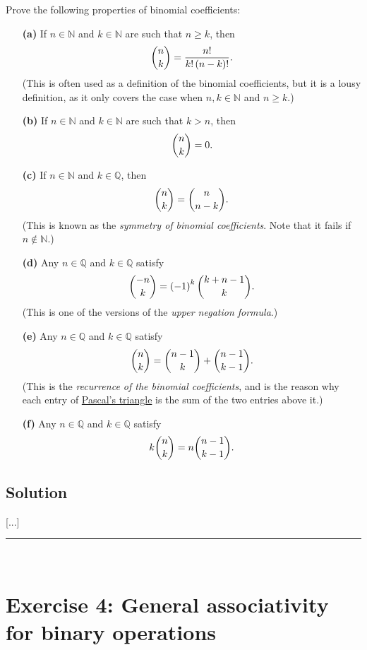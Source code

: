 \documentclass[paper=a4, fontsize=12pt]{scrartcl} %
\newcommand{\QQ}{\mathbb{Q}} %
\newcommand{\NN}{\mathbb{N}} %
\newcommand{\tup}[1]{\left( #1 \right)}
\newcommand{\horrule}[1]{\rule{\linewidth}{#1}} %
\theoremstyle{plainsl}
\theoremstyle{definition}
\theoremstyle{remark}
\begin{document}
Prove the following properties of binomial coefficients:

\begin{enumerate}

\item[\textbf{(a)}]
If $n \in \NN$ and $k \in \NN$ are such that $n \geq k$,
then
\[
\dbinom{n}{k}
= \dfrac{n!}{k! \tup{n-k}!} .
\]
(This is often used as a definition of the binomial coefficients,
but it is a lousy definition, as it
only covers the case when $n, k \in \NN$ and $n \geq k$.)

\item[\textbf{(b)}]
If $n \in \NN$ and $k \in \NN$ are such that $k > n$, then
\[
\dbinom{n}{k} = 0.
\]

\item[\textbf{(c)}]
If $n \in \NN$ and $k \in \QQ$, then
\[
\dbinom{n}{k} = \dbinom{n}{n-k} .
\]
(This is known as the \textit{symmetry of binomial coefficients}.
Note that it fails if $n \notin \NN$.)

\item[\textbf{(d)}]
Any $n \in \QQ$ and $k \in \QQ$ satisfy
\[
\dbinom{-n}{k} = \tup{-1}^k \dbinom{k + n - 1}{k} .
\]
(This is one of the versions of the \textit{upper negation formula}.)

\item[\textbf{(e)}]
Any $n \in \QQ$ and $k \in \QQ$ satisfy
\[
\dbinom{n}{k} = \dbinom{n-1}{k} + \dbinom{n-1}{k-1} .
\]
(This is the \textit{recurrence of the binomial coefficients},
and is the reason why each entry of
\href{https://en.wikipedia.org/wiki/Pascal%27s_triangle}{Pascal's triangle}
is the sum of the two entries above it.)

\item[\textbf{(f)}]
Any $n \in \QQ$ and $k \in \QQ$ satisfy
\[
k \dbinom{n}{k} = n \dbinom{n-1}{k-1} .
\]

\end{enumerate}

\subsection{Solution}

[...]

\horrule{0.3pt} \\[0.4cm]

\section{Exercise 4: General associativity for binary operations}
\end{document}
